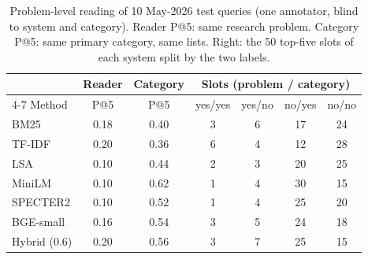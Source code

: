 \begin{table}[!t]
\centering
\caption{Problem-level reading of 10 May-2026 test queries (one annotator, blind to system and category). Reader P@5: same research problem. Category P@5: same primary category, same lists. Right: the 50 top-five slots of each system split by the two labels.}
\label{tab:reader}
\scriptsize
\setlength{\tabcolsep}{2.6pt}
\begin{tabular}{@{}lcccccc@{}}
\toprule
 & Reader & Category & \multicolumn{4}{c}{Slots (problem / category)} \\
\cmidrule(l){4-7}
Method & P@5 & P@5 & yes/yes & yes/no & no/yes & no/no \\
\midrule
BM25 & 0.18 & 0.40 & 3 & 6 & 17 & 24 \\
TF-IDF & 0.20 & 0.36 & 6 & 4 & 12 & 28 \\
LSA & 0.10 & 0.44 & 2 & 3 & 20 & 25 \\
MiniLM & 0.10 & 0.62 & 1 & 4 & 30 & 15 \\
SPECTER2 & 0.10 & 0.52 & 1 & 4 & 25 & 20 \\
BGE-small & 0.16 & 0.54 & 3 & 5 & 24 & 18 \\
Hybrid (0.6) & 0.20 & 0.56 & 3 & 7 & 25 & 15 \\
\bottomrule
\end{tabular}
\end{table}
